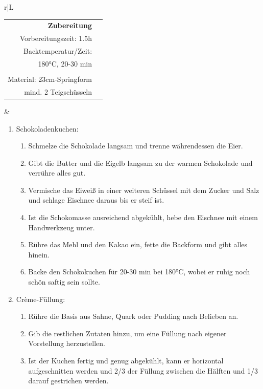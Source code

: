\documentclass[a4paper, 12pt]{scrbook} 								%
\numberwithin{equation}{section} 									%
\begin{document}
			\begin{tabularx}{\textwidth}{r|L}
		
		
			\begin{tabular}[t]{rr}
				\textbf{Zubereitung}	\\
				\small Vorbereitungszeit: 1.5h	\\
				\small Backtemperatur/Zeit: \\ 
				\small 180°C, 20-30 min \\\\
				\small Material: 23cm-Springform\\ 
				\small mind. 2 Teigschüsseln \\
			\end{tabular}			&	\begin{enumerate}[]

											\item Schokoladenkuchen:
											\begin{enumerate}[]
											\item Schmelze die Schokolade langsam und trenne währendessen die Eier.
											\item Gibt die Butter und die Eigelb langsam zu der warmen Schokolade und verrühre alles gut.
											\item Vermische das Eiweiß in einer weiteren Schüssel mit dem Zucker und Salz und schlage Eischnee daraus bis er steif ist.
											\item Ist die Schokomasse ausreichend abgekühlt, hebe den Eischnee mit einem Handwerkzeug unter.
											\item Rühre das Mehl und den Kakao ein, fette die Backform und gibt alles hinein.
											\item Backe den Schokokuchen für 20-30 min bei 180°C, wobei er ruhig noch schön saftig sein sollte.
											\end{enumerate}

											\item Crème-Füllung:
											\begin{enumerate}[]
											\item Rühre die Basis aus Sahne, Quark oder Pudding nach Belieben an.
											\item Gib die restlichen Zutaten hinzu, um eine Füllung nach eigener Vorstellung herzustellen.
											\item Ist der Kuchen fertig und genug abgekühlt, kann er horizontal aufgeschnitten werden und 2/3 der Füllung zwischen die Hälften und 1/3 darauf gestrichen werden.
											\end{enumerate}


\end{enumerate}
\end{tabularx}
\end{document}
